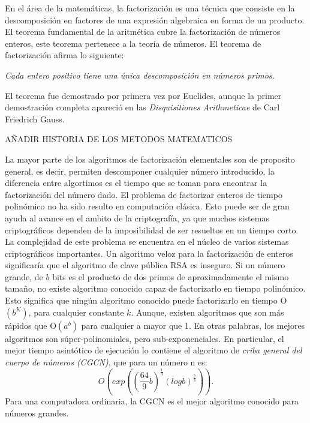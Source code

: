 En el área de la matemáticas, la factorización es una técnica que consiste en la descomposición en factores de una expresión algebraica
en forma de un producto. El teorema fundamental de la aritmética cubre la factorización de números enteros, este teorema pertenece a la teoría
de números. El teorema de factorización afirma lo siguiente:
\begin{center}
    \textit{Cada entero positivo tiene una única descomposición en números primos.}
\end{center}
El teorema fue demostrado por primera vez por Euclides, aunque la primer demostración completa apareció en las \textit{Disquisitiones Arithmeticae}
de Carl Friedrich Gauss.\\
\begin{center}
AÑADIR HISTORIA DE LOS METODOS MATEMATICOS
\end{center}
La mayor parte de los algoritmos de factorización elementales son de proposito general, es decir, permiten descomponer cualquier
número introducido, la diferencia entre algortimos es el tiempo que se toman para encontrar la factorización del número dado. El problema de 
factorizar enteros de tiempo polinómico no ha sido resulto en computación clásica. Esto puede ser de gran ayuda al avance en el ambito de la 
criptografía, ya que muchos sistemas criptográficos dependen de la imposibilidad de ser resueltos en un tiempo corto.\\
La complejidad de este problema se encuentra en el núcleo de varios sistemas criptográficos importantes. Un algoritmo veloz para la factorización
de enteros significaría que el algoritmo de clave pública RSA es inseguro. Si un número grande, de $b$ bits es el producto de dos primos
de aproximadamente el mismo tamaño, no existe algoritmo conocido capaz de factorizarlo en tiempo polinómico. Esto significa que ningún algoritmo
conocido puede factorizarlo en tiempo O$(b^K)$, para cualquier constante $k$. Aunque, existen algoritmos que son más rápidos que O$(a^b)$ para cualquier a 
mayor que 1. En otras palabras, los mejores algoritmos son súper-polinomiales, pero sub-exponenciales. En particular, el mejor tiempo
asintótico de ejecución lo contiene el algoritmo de \textit{criba general del cuerpo de números (CGCN)}, que para un número n es:
\begin{equation}
    O\left(exp\left(\left(\frac{64}{9}b\right)^\frac{1}{3} \left(log b\right)^\frac{2}{3} \right) \right).
    \label{eq:O(clasico)}
\end{equation}
Para una computadora ordinaria, la CGCN es el mejor algoritmo conocido para números grandes. 